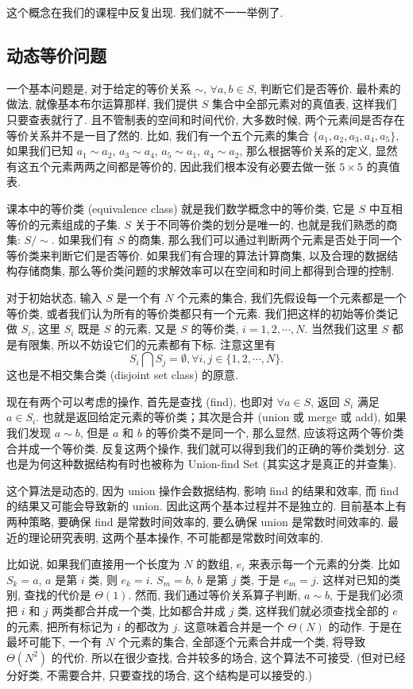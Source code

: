 \documentclass[a4paper]{ctexart}
\theoremstyle{definition}
\theoremstyle{definition}
\begin{document}
这个概念在我们的课程中反复出现. 我们就不一一举例了. 

\subsection{动态等价问题}

一个基本问题是, 对于给定的等价关系 $\sim$, $\forall a, b \in S$, 判断它们是否等价. 
最朴素的做法, 就像基本布尔运算那样, 我们提供 $S$ 集合中全部元素对的真值表, 
这样我们只要查表就行了. 且不管制表的空间和时间代价, 大多数时候, 两个元素间是否存在等价关系并不是一目了然的. 
比如, 我们有一个五个元素的集合 $\{a_1, a_2, a_3, a_4, a_5\}$, 如果我们已知 $a_1 \sim a_2$, $a_3 \sim a_4$, 
$a_5 \sim a_1$, $a_4 \sim a_2$, 那么根据等价关系的定义, 显然有这五个元素两两之间都是等价的, 
因此我们根本没有必要去做一张 $5 \times 5$ 的真值表. 

课本中的等价类 (equivalence class) 就是我们数学概念中的等价类, 
它是 $S$ 中互相等价的元素组成的子集. $S$ 关于不同等价类的划分是唯一的, 
也就是我们熟悉的商集: $S / \sim$. 如果我们有 $S$ 的商集, 
那么我们可以通过判断两个元素是否处于同一个等价类来判断它们是否等价. 
如果我们有合理的算法计算商集, 以及合理的数据结构存储商集, 
那么等价类问题的求解效率可以在空间和时间上都得到合理的控制. 

对于初始状态, 输入 $S$ 是一个有 $N$ 个元素的集合, 我们先假设每一个元素都是一个等价类, 
或者我们认为所有的等价类都只有一个元素. 我们把这样的初始等价类记做 $S_i$, 这里 $S_i$ 既是 $S$ 的元素, 
又是 $S$ 的等价类, $i = 1, 2, \cdots, N$. 当然我们这里 $S$ 都是有限集, 
所以不妨设它们的元素都有下标. 注意这里有 
$$
S_i \bigcap S_j = \emptyset, \forall i, j \in \{1, 2, \cdots, N\}.
$$ 
这也是不相交集合类 (disjoint set class) 的原意.

现在有两个可以考虑的操作, 首先是查找 (find), 也即对 $\forall a \in S$, 
返回 $S_i$ 满足 $a \in S_i$. 也就是返回给定元素的等价类；其次是合并 (union 或 merge 或 add), 
如果我们发现 $a \sim b$, 但是 $a$ 和 $b$ 的等价类不是同一个, 那么显然, 
应该将这两个等价类合并成一个等价类. 反复这两个操作, 我们就可以得到我们的正确的等价类划分. 
这也是为何这种数据结构有时也被称为 Union-find Set (其实这才是真正的并查集).

这个算法是动态的, 因为 union 操作会数据结构, 影响 find 的结果和效率, 而 find 的结果又可能会导致新的 union. 
因此这两个基本过程并不是独立的. 目前基本上有两种策略, 要确保 find 是常数时间效率的, 要么确保 union 是常数时间效率的. 
最近的理论研究表明, 这两个基本操作, 不可能都是常数时间效率的. 

比如说, 如果我们直接用一个长度为 $N$ 的数组, $e_i$ 来表示每一个元素的分类. 
比如 $S_k = a$, $a$ 是第 $i$ 类, 则 $e_k = i$. $S_m = b$, $b$ 是第 $j$ 类, 
于是 $e_m = j$. 这样对已知的类别, 查找的代价是 $\Theta(1)$. 然而, 
我们通过等价关系算子判断, $a \sim b$, 于是我们必须把 $i$ 和 $j$ 两类都合并成一个类, 
比如都合并成 $j$ 类, 这样我们就必须查找全部的 $e$ 的元素, 把所有标记为 $i$ 的都改为 $j$. 
这意味着合并是一个 $\Theta(N)$ 的动作. 于是在最坏可能下, 一个有 $N$ 个元素的集合, 
全部逐个元素合并成一个类, 将导致 $\Theta(N^2)$ 的代价. 所以在很少查找, 合并较多的场合, 
这个算法不可接受. (但对已经分好类, 不需要合并, 只要查找的场合, 这个结构是可以接受的.) 
\end{document}
